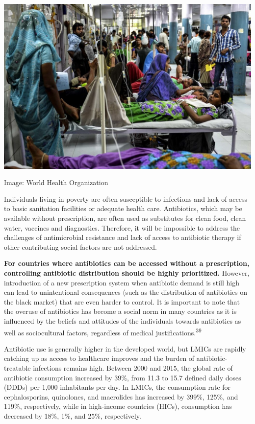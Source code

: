 \documentclass[
  11pt,
  paper=a4,
  ,captions=tableheading
]{scrartcl}
\begin{document}
\includegraphics[width=6.25in,height=\textheight]{images/LMIC.jpeg}

Image: World Health Organization

Individuals living in poverty are often susceptible to infections and
lack of access to basic sanitation facilities or adequate health care.
Antibiotics, which may be available without prescription, are often used
as substitutes for clean food, clean water, vaccines and diagnostics.
Therefore, it will be impossible to address the challenges of
antimicrobial resistance and lack of access to antibiotic therapy if
other contributing social factors are not addressed.

\textbf{For countries where antibiotics can be accessed without a
prescription, controlling antibiotic distribution should be highly
prioritized.} However, introduction of a new prescription system when
antibiotic demand is still high can lead to unintentional consequences
(such as the distribution of antibiotics on the black market) that are
even harder to control. It is important to note that the overuse of
antibiotics has become a social norm in many countries as it is
influenced by the beliefs and attitudes of the individuals towards
antibiotics as well as sociocultural factors, regardless of medical
justifications.\textsuperscript{39}

Antibiotic use is generally higher in the developed world, but LMICs are
rapidly catching up as access to healthcare improves and the burden of
antibiotic-treatable infections remains high. Between 2000 and 2015, the
global rate of antibiotic consumption increased by 39\%, from 11.3 to
15.7 defined daily doses (DDDs) per 1,000 inhabitants per day. In LMICs,
the consumption rate for cephalosporins, quinolones, and macrolides has
increased by 399\%, 125\%, and 119\%, respectively, while in high-income
countries (HICs), consumption has decreased by 18\%, 1\%, and 25\%,
respectively.
\end{document}
